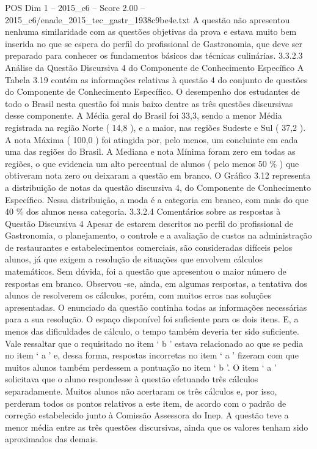 \begin{textsample}{POS Dim 1 – 2015\_c6 – Score 2.00 – 2015\_c6/enade\_2015\_tec\_gastr\_1938c9be4e.txt}
A questão não apresentou nenhuma similaridade com as questões objetivas da prova e estava muito bem inserida no que se espera do perfil do profissional de Gastronomia, que deve ser preparado para conhecer os fundamentos básicos das técnicas culinárias. 3.3.2.3 Análise da Questão Discursiva 4 do Componente de Conhecimento Específico A Tabela 3.19 contém as informações relativas à questão 4 do conjunto de questões do Componente de Conhecimento Específico.
O desempenho dos estudantes de todo o Brasil nesta questão foi mais baixo dentre as três questões discursivas desse componente.
A Média geral do Brasil foi 33,3, sendo a menor Média registrada na região Norte ( 14,8 ), e a maior, nas regiões Sudeste e Sul ( 37,2 ).
A nota Máxima ( 100,0 ) foi atingida por, pelo menos, um concluinte em cada uma das regiões do Brasil.
A Mediana e nota Mínima foram zero em todas as regiões, o que evidencia um alto percentual de alunos ( pelo menos 50 \% ) que obtiveram nota zero ou deixaram a questão em branco.
O Gráfico 3.12 representa a distribuição de notas da questão discursiva 4, do Componente de Conhecimento Específico.
Nessa distribuição, a moda é a categoria em branco, com mais do que 40 \% dos alunos nessa categoria. 3.3.2.4 Comentários sobre as respostas à Questão Discursiva 4 Apesar de estarem descritos no perfil do profissional de Gastronomia, o planejamento, o controle e a avaliação de custos na administração de restaurantes e estabelecimentos comerciais, são consideradas difíceis pelos alunos, já que exigem a resolução de situações que envolvem cálculos matemáticos.
Sem dúvida, foi a questão que apresentou o maior número de respostas em branco.
Observou -se, ainda, em algumas respostas, a tentativa dos alunos de resolverem os cálculos, porém, com muitos erros nas soluções apresentadas.
O enunciado da questão continha todas as informações necessárias para a sua resolução.
O espaço disponível foi suficiente para os dois itens.
E, a menos das dificuldades de cálculo, o tempo também deveria ter sido suficiente.
Vale ressaltar que o requisitado no item ‘ b ’ estava relacionado ao que se pedia no item ‘ a ’ e, dessa forma, respostas incorretas no item ‘ a ’ fizeram com que muitos alunos também perdessem a pontuação no item ‘ b ’.
O item ‘ a ’ solicitava que o aluno respondesse à questão efetuando três cálculos separadamente.
Muitos alunos não acertaram os três cálculos e, por isso, perderam todos os pontos relativos a este item, de acordo com o padrão de correção estabelecido junto à Comissão Assessora do Inep.
A questão teve a menor média entre as três questões discursivas, ainda que os valores tenham sido aproximados das demais.

\end{textsample}
